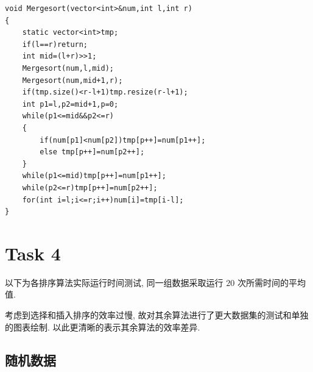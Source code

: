 \begin{lstlisting}
void Mergesort(vector<int>&num,int l,int r)
{
	static vector<int>tmp;
	if(l==r)return;
	int mid=(l+r)>>1;
	Mergesort(num,l,mid);
	Mergesort(num,mid+1,r);
	if(tmp.size()<r-l+1)tmp.resize(r-l+1);
	int p1=l,p2=mid+1,p=0;
	while(p1<=mid&&p2<=r)
	{
		if(num[p1]<num[p2])tmp[p++]=num[p1++];
		else tmp[p++]=num[p2++];
	}
	while(p1<=mid)tmp[p++]=num[p1++];
	while(p2<=r)tmp[p++]=num[p2++];
	for(int i=l;i<=r;i++)num[i]=tmp[i-l];
}
\end{lstlisting}

\section{Task 4}

以下为各排序算法实际运行时间测试, 同一组数据采取运行 $20$ 次所需时间的平均值.

考虑到选择和插入排序的效率过慢, 故对其余算法进行了更大数据集的测试和单独的图表绘制. 以此更清晰的表示其余算法的效率差异.

\subsection{随机数据}

